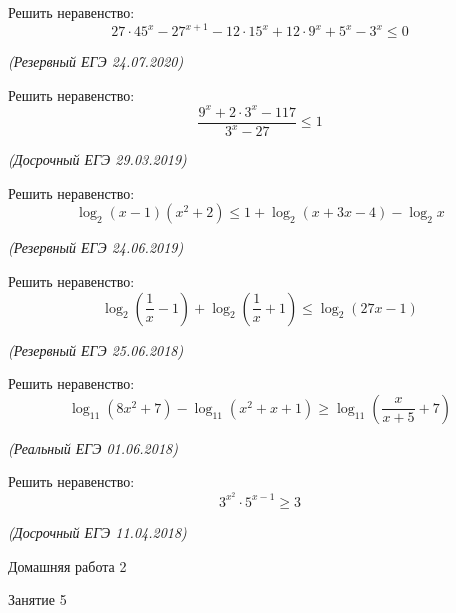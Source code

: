 \begin{class}[number=4]
	\begin{listofex}
		\item Решить неравенство:
		\[ 27\cdot45^x-27^{x+1}-12\cdot15^x+12\cdot9^x+5^x-3^x\le0 \]
		\begin{flushright}
			\textit{(Резервный ЕГЭ 24.07.2020)}
		\end{flushright}
		\item Решить неравенство:
		\[ \dfrac{9^x+2\cdot3^x-117}{3^x-27}\le1 \]
		\begin{flushright}
			\textit{(Досрочный ЕГЭ 29.03.2019)}
		\end{flushright}
		\item Решить неравенство:
		\[ \log_2(x-1)(x^2+2)\le1+\log_2(x+3x-4)-\log_2x \]
		\begin{flushright}
			\textit{(Резервный ЕГЭ 24.06.2019)}
		\end{flushright}
		\item Решить неравенство:
		\[ \log_2\left( \dfrac{1}{x}-1 \right)+\log_2\left( \dfrac{1}{x}+1 \right)\le\log_2(27x-1) \]
		\begin{flushright}
			\textit{(Резервный ЕГЭ 25.06.2018)}
		\end{flushright}
		\item Решить неравенство:
		\[ \log_{11}(8x^2+7)-\log_{11}(x^2+x+1)\ge\log_{11}\left( \dfrac{x}{x+5}+7 \right) \]
		\begin{flushright}
			\textit{(Реальный ЕГЭ 01.06.2018)}
		\end{flushright}
		\item Решить неравенство:
		\[ 3^{x^2}\cdot5^{x-1}\ge3 \]
		\begin{flushright}
			\textit{(Досрочный ЕГЭ 11.04.2018)}
		\end{flushright}
	\end{listofex}
\end{class}

\begin{homework}[number=2]
	\begin{listofex}
		\item Домашняя работа 2
	\end{listofex}
\end{homework}

\begin{class}[number=5]
	\begin{listofex}
		\item Занятие 5
	\end{listofex}
\end{class}


